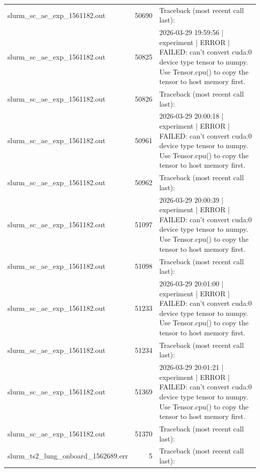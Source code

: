 \begin{tabular}{lrl}
slurm\_sc\_ae\_exp\_1561182.out & 50690 & Traceback (most recent call last): \\
slurm\_sc\_ae\_exp\_1561182.out & 50825 & 2026-03-29 19:59:56 | experiment | ERROR |   FAILED: can't convert cuda:0 device type tensor to numpy. Use Tensor.cpu() to copy the tensor to host memory first. \\
slurm\_sc\_ae\_exp\_1561182.out & 50826 & Traceback (most recent call last): \\
slurm\_sc\_ae\_exp\_1561182.out & 50961 & 2026-03-29 20:00:18 | experiment | ERROR |   FAILED: can't convert cuda:0 device type tensor to numpy. Use Tensor.cpu() to copy the tensor to host memory first. \\
slurm\_sc\_ae\_exp\_1561182.out & 50962 & Traceback (most recent call last): \\
slurm\_sc\_ae\_exp\_1561182.out & 51097 & 2026-03-29 20:00:39 | experiment | ERROR |   FAILED: can't convert cuda:0 device type tensor to numpy. Use Tensor.cpu() to copy the tensor to host memory first. \\
slurm\_sc\_ae\_exp\_1561182.out & 51098 & Traceback (most recent call last): \\
slurm\_sc\_ae\_exp\_1561182.out & 51233 & 2026-03-29 20:01:00 | experiment | ERROR |   FAILED: can't convert cuda:0 device type tensor to numpy. Use Tensor.cpu() to copy the tensor to host memory first. \\
slurm\_sc\_ae\_exp\_1561182.out & 51234 & Traceback (most recent call last): \\
slurm\_sc\_ae\_exp\_1561182.out & 51369 & 2026-03-29 20:01:21 | experiment | ERROR |   FAILED: can't convert cuda:0 device type tensor to numpy. Use Tensor.cpu() to copy the tensor to host memory first. \\
slurm\_sc\_ae\_exp\_1561182.out & 51370 & Traceback (most recent call last): \\
slurm\_ts2\_lung\_onboard\_1562689.err & 5 & Traceback (most recent call last): \\
\bottomrule
\end{tabular}
